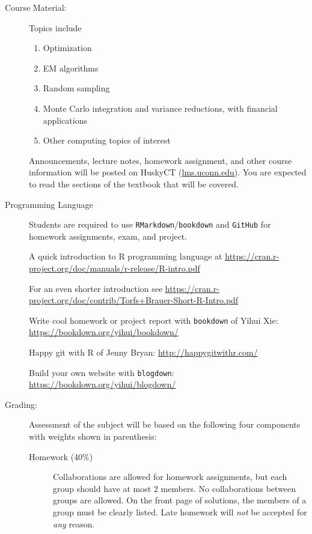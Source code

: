 \documentclass[twocolumn]{article}
\begin{document}
\begin{description}
\item[Course Material:]
Topics include
\begin{enumerate}[noitemsep]
\item Optimization
\item EM algorithms
\item Random sampling
\item Monte Carlo integration and variance reductions, with financial applications
\item Other computing topics of interest
\end{enumerate}

Announcements, lecture notes, homework assignment, and other course
information will be posted on HuskyCT (\url{lms.uconn.edu}). 
You are expected to read the sections of the textbook that will be covered.

\item[Programming Language]
Students are required to use \texttt{RMarkdown}/\texttt{bookdown} and
\texttt{GitHub} for homework assignments, exam, and project.


A quick introduction to R programming language at
\url{https://cran.r-project.org/doc/manuals/r-release/R-intro.pdf}

For an even shorter introduction see
\url{https://cran.r-project.org/doc/contrib/Torfs+Brauer-Short-R-Intro.pdf}

Write cool homework or project report with \texttt{bookdown} of Yihui Xie:
\url{https://bookdown.org/yihui/bookdown/}


Happy git with R of Jenny Bryan:
\url{http://happygitwithr.com/}

Build your own website with \texttt{blogdown}:
\url{https://bookdown.org/yihui/blogdown/}


\item[Grading:] Assessment of the subject will be based on 
the following four components with weights shown in parenthesis:

\begin{description}
\item[Homework (40\%)]
Collaborations are allowed for homework assignments, but each group
should have at most 2 members. No collaborations between groups are
allowed. On the front page of solutions, the members of a group must be
clearly listed. Late homework will \emph{not} be accepted for \emph{any}
reason. 


\end{description}
\end{description}
\end{document}
